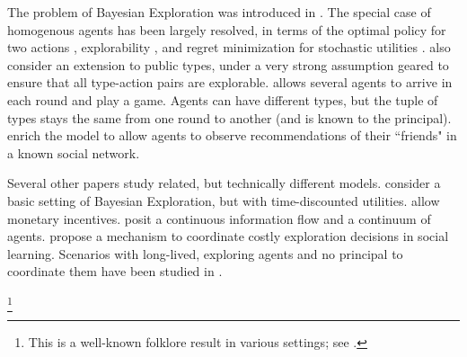 
The problem of Bayesian Exploration was introduced in \cite{Kremer-JPE14}. The special case of homogenous agents has been largely resolved, in terms of the optimal policy for two actions \cite{Kremer-JPE14}, explorability \cite{ICexplorationGames-ec16-working}, and regret minimization for stochastic utilities \cite{ICexploration-ec15-working}. \cite{ICexploration-ec15-working} also consider an extension to public types, under a very strong assumption geared to ensure that all type-action pairs are explorable. \cite{ICexplorationGames-ec16-working} allows several agents to arrive in each round and play a game. Agents can have different types, but the tuple of types stays the same from one round to another (and is known to the principal). \cite{Bahar-ec16} enrich the model to allow agents to observe recommendations of their ``friends" in a known social network.

Several other papers study related, but technically different models. \cite{Bimpikis-exploration-ms17} consider a basic setting of Bayesian Exploration, but with time-discounted utilities. \cite{Frazier-ec14,Kempe-colt18} allow monetary incentives. \cite{Che-13} posit a continuous information flow and a continuum of agents. \cite{Bobby-Glen-ec16} propose a mechanism to coordinate costly exploration decisions in social learning. Scenarios with long-lived, exploring agents and no principal to coordinate them have been studied in \cite{Bolton-econometrica99,Keller-econometrica05}. 



%
\footnote{This is a well-known folklore result in various settings; \eg see \cite{CompetingBandits-itcs18,Sven-aistats18}.}



